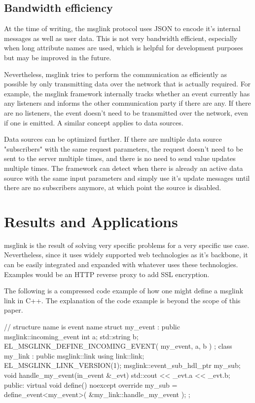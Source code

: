 \documentclass[conference]{IEEEtran}
\begin{document}
\subsection{Bandwidth efficiency}

At the time of writing, the msglink protocol uses JSON to encode it's internal messages as well as user data. This is not very bandwidth efficient, especially when long attribute names are used, which is helpful for development purposes but may be improved in the future. 

Nevertheless, msglink tries to perform the communication as efficiently as possible by only transmitting data over the network that is actually required. For example, the msglink framework internally tracks whether an event currently has any listeners and informs the other communication party if there are any. If there are no listeners, the event doesn't need to be transmitted over the network, even if one is emitted. A similar concept applies to data sources.

Data sources can be optimized further. If there are multiple data source "subscribers" with the same request parameters, the request doesn't need to be sent to the server multiple times, and there is no need to send value updates multiple times. The framework can detect when there is already an active data source with the same input parameters and simply use it's update messages until there are no subscribers anymore, at which point the source is disabled.

\section{Results and Applications}

msglink is the result of solving very specific problems for a very specific use case. Nevertheless, since it uses widely supported web technologies as it's backbone, it can be easily integrated and expanded with whatever uses these technologies. Examples would be an HTTP reverse proxy to add SSL encryption.

The following is a compressed code example of how one might define a msglink link in C++. The explanation of the code example is beyond the scope of this paper.

\begin{code-cpp}
// structure name is event name
struct my_event 
    : public msglink::incoming_event {
    int a;
    std::string b;
    EL_MSGLINK_DEFINE_INCOMING_EVENT(
        my_event, a, b
    )
};
class my_link : public msglink::link {
    using link::link;
    EL_MSGLINK_LINK_VERSION(1);
    msglink::event_sub_hdl_ptr my_sub;
    void handle_my_event(in_event &_evt) {
        std::cout << _evt.a << _evt.b;
    }
public:
    virtual void define() noexcept override {
        my_sub = define_event<my_event>(
            &my_link::handle_my_event
        );
    }
};
\end{code-cpp}
\end{document}
